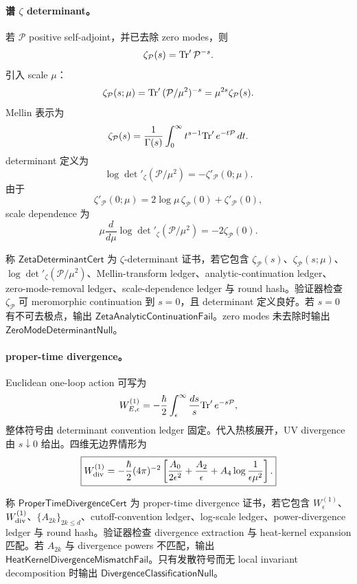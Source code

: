 \paragraph{谱 \(\zeta\) determinant。}
若 \(\mathcal P\) positive self-adjoint，并已去除 zero modes，则
\[
\zeta_{\mathcal P}(s)={\rm Tr}'\,\mathcal P^{-s}.
\]
引入 scale \(\mu\)：
\[
\zeta_{\mathcal P}(s;\mu)
=
{\rm Tr}'\,(\mathcal P/\mu^2)^{-s}
=
\mu^{2s}\zeta_{\mathcal P}(s).
\]
Mellin 表示为
\[
\zeta_{\mathcal P}(s)
=
\frac1{\Gamma(s)}
\int_0^\infty t^{s-1}{\rm Tr}'\,e^{-t\mathcal P}\,dt.
\]
determinant 定义为
\[
\boxed{
\log\det{}'_\zeta(\mathcal P/\mu^2)
=
-\zeta'_{\mathcal P}(0;\mu).
}
\]
由于
\[
\zeta'_{\mathcal P}(0;\mu)
=
2\log\mu\,\zeta_{\mathcal P}(0)+\zeta'_{\mathcal P}(0),
\]
scale dependence 为
\[
\mu\frac{d}{d\mu}
\log\det{}'_\zeta(\mathcal P/\mu^2)
=
-2\zeta_{\mathcal P}(0).
\]

\begin{definition}\label{def:typed-address-biaxial-completion-zeta-determinant-cert}
称 \(\mathsf{ZetaDeterminantCert}\) 为 \(\zeta\)-determinant 证书，若它包含 \(\zeta_{\mathcal P}(s)\)、\(\zeta_{\mathcal P}(s;\mu)\)、\(\log\det{}'_\zeta(\mathcal P/\mu^2)\)、Mellin-transform ledger、analytic-continuation ledger、zero-mode-removal ledger、scale-dependence ledger 与 round hash。验证器检查 \(\zeta_{\mathcal P}\) 可 meromorphic continuation 到 \(s=0\)，且 determinant 定义良好。若 \(s=0\) 有不可去极点，输出 \(\mathsf{ZetaAnalyticContinuationFail}\)。zero modes 未去除时输出 \(\mathsf{ZeroModeDeterminantNull}\)。
\end{definition}

\paragraph{proper-time divergence。}
Euclidean one-loop action 可写为
\[
W_{E,\epsilon}^{(1)}
=
-\frac{\hbar}{2}
\int_\epsilon^\infty
\frac{ds}{s}
{\rm Tr}'\,e^{-s\mathcal P},
\]
整体符号由 determinant convention ledger 固定。代入热核展开，UV divergence 由 \(s\downarrow0\) 给出。四维无边界情形为
\[
\boxed{
W_{\rm div}^{(1)}
=
-\frac{\hbar}{2}(4\pi)^{-2}
\left[
\frac{A_0}{2\epsilon^2}
+
\frac{A_2}{\epsilon}
+
A_4\log\frac1{\epsilon\mu^2}
\right].
}
\]

\begin{definition}\label{def:typed-address-biaxial-completion-proper-time-divergence-cert}
称 \(\mathsf{ProperTimeDivergenceCert}\) 为 proper-time divergence 证书，若它包含 \(W_\epsilon^{(1)}\)、\(W_{\rm div}^{(1)}\)、\(\{A_{2k}\}_{2k\le d}\)、cutoff-convention ledger、log-scale ledger、power-divergence ledger 与 round hash。验证器检查 divergence extraction 与 heat-kernel expansion 匹配。若 \(A_{2k}\) 与 divergence powers 不匹配，输出 \(\mathsf{HeatKernelDivergenceMismatchFail}\)。只有发散符号而无 local invariant decomposition 时输出 \(\mathsf{DivergenceClassificationNull}\)。
\end{definition}

